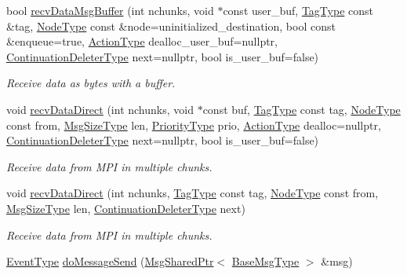 \begin{DoxyCompactItemize}
bool \hyperlink{structvt_1_1messaging_1_1_active_messenger_a48518ecdb0ae882a36994dddd8f3eef8}{recv\+Data\+Msg\+Buffer} (int nchunks, void $\ast$const user\+\_\+buf, \hyperlink{namespacevt_a84ab281dae04a52a4b243d6bf62d0e52}{Tag\+Type} const \&tag, \hyperlink{namespacevt_a866da9d0efc19c0a1ce79e9e492f47e2}{Node\+Type} const \&node=uninitialized\+\_\+destination, bool const \&enqueue=true, \hyperlink{namespacevt_ae0a5a7b18cc99d7b732cb4d44f46b0f3}{Action\+Type} dealloc\+\_\+user\+\_\+buf=nullptr, \hyperlink{namespacevt_a6de3bd201e2a040be9362d9d24d1e446}{Continuation\+Deleter\+Type} next=nullptr, bool is\+\_\+user\+\_\+buf=false)
\begin{DoxyCompactList}\small\item\em Receive data as bytes with a buffer. \end{DoxyCompactList}\item 
void \hyperlink{structvt_1_1messaging_1_1_active_messenger_a030dfbfd95be050b71eea091d07bd66a}{recv\+Data\+Direct} (int nchunks, void $\ast$const buf, \hyperlink{namespacevt_a84ab281dae04a52a4b243d6bf62d0e52}{Tag\+Type} const tag, \hyperlink{namespacevt_a866da9d0efc19c0a1ce79e9e492f47e2}{Node\+Type} const from, \hyperlink{namespacevt_a408e86a8c7c89309b52907dc5a513924}{Msg\+Size\+Type} len, \hyperlink{namespacevt_a86bff9f556eb761b27fc8600d006ac04}{Priority\+Type} prio, \hyperlink{namespacevt_ae0a5a7b18cc99d7b732cb4d44f46b0f3}{Action\+Type} dealloc=nullptr, \hyperlink{namespacevt_a6de3bd201e2a040be9362d9d24d1e446}{Continuation\+Deleter\+Type} next=nullptr, bool is\+\_\+user\+\_\+buf=false)
\begin{DoxyCompactList}\small\item\em Receive data from M\+PI in multiple chunks. \end{DoxyCompactList}\item 
void \hyperlink{structvt_1_1messaging_1_1_active_messenger_a978662aef65c15652448619d7c58dadc}{recv\+Data\+Direct} (int nchunks, \hyperlink{namespacevt_a84ab281dae04a52a4b243d6bf62d0e52}{Tag\+Type} const tag, \hyperlink{namespacevt_a866da9d0efc19c0a1ce79e9e492f47e2}{Node\+Type} const from, \hyperlink{namespacevt_a408e86a8c7c89309b52907dc5a513924}{Msg\+Size\+Type} len, \hyperlink{namespacevt_a6de3bd201e2a040be9362d9d24d1e446}{Continuation\+Deleter\+Type} next)
\begin{DoxyCompactList}\small\item\em Receive data from M\+PI in multiple chunks. \end{DoxyCompactList}\item 
\hyperlink{namespacevt_a009267401def7ae8bf201892222d060f}{Event\+Type} \hyperlink{structvt_1_1messaging_1_1_active_messenger_aa8eb9f6ac7daee5782dbf6ff790eca34}{do\+Message\+Send} (\hyperlink{structvt_1_1messaging_1_1_msg_shared_ptr}{Msg\+Shared\+Ptr}$<$ \hyperlink{namespacevt_a44d0d4e144748f2b19a1cfd962f50338}{Base\+Msg\+Type} $>$ \&msg)

\end{DoxyCompactItemize}
